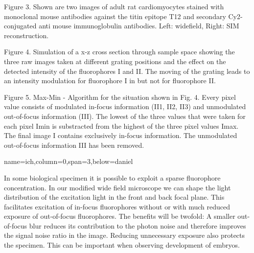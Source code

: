 \documentclass[portrait,draft]{baposter}
\begin{document}
\begin{poster}
{    Figure 3. Shown are two images of adult rat cardiomyocytes stained
    with monoclonal mouse antibodies against the titin epitope T12 and
    secondary Cy2-conjugated anti mouse immunoglobulin
    antibodies. Left: widefield, Right: SIM reconstruction.

    Figure 4. Simulation of a x-z cross section through sample space
    showing the three raw images taken at different grating positions
    and the effect on the detected intensity of the fluorophores I and
    II. The moving of the grating leads to an intensity modulation for
    fluorophore I in but not for fluorophore II.


    Figure 5. Max-Min - Algorithm for the situation shown in
    Fig. 4. Every pixel value consists of modulated in-focus
    information (II1, II2, II3) and unmodulated out-of-focus
    information (III). The lowest of the three values that were taken
    for each pixel Imin is substracted from the highest of the three
    pixel values Imax. The final image I contains exclusively in-focus
    information. The unmodulated out-of-focus information III has been
    removed.
  }
  
  



  
{name=ich,column=0,span=3,below=daniel}{
  {}
  In some biological specimen it is possible to exploit a sparse
  fluorophore concentration. In our modified wide field microscope we
  can shape the light distribution of the excitation light in the
  front and back focal plane. This facilitates excitation of in-focus
  fluorophores without or with much reduced exposure of out-of-focus
  fluorophores. The benefits will be twofold: A smaller out-of-focus
  blur reduces its contribution to the photon noise and therefore
  improves the signal noise ratio in the image. Reducing unnecessary
  exposure also protects the specimen. This can be important when
  observing development of embryos.

}
\end{poster}
\end{document}
